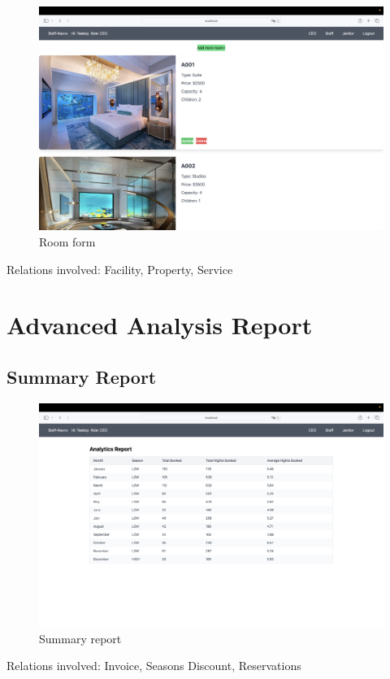 \begin{figure}[h]
	\centerline
	{\includegraphics[width=12cm]{fig/3_rooms}}
	\caption{Room form}
\end{figure} 

Relations involved: Facility, Property, Service

\section{Advanced Analysis Report}

\subsection{Summary Report}
\begin{figure}[h]
	\centerline
	{\includegraphics[width=12cm]{fig/5_summary}}
	\caption{Summary report}
\end{figure} 

Relations involved: Invoice, Seasons Discount, Reservations

